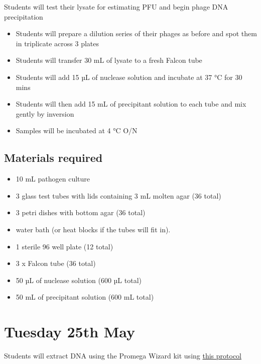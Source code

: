 \documentclass[
]{book}
\providecommand{\tightlist}{%
  \setlength{\itemsep}{0pt}\setlength{\parskip}{0pt}}
\begin{document}
Students will test their lysate for estimating PFU and begin phage DNA precipitation

\begin{itemize}
\tightlist
\item
  Students will prepare a dilution series of their phages as before and spot them in triplicate across 3 plates
\item
  Students will transfer 30 mL of lysate to a fresh Falcon tube
\item
  Students will add 15 µL of nuclease solution and incubate at 37 °C for 30 mins
\item
  Students will then add 15 mL of precipitant solution to each tube and mix gently by inversion
\item
  Samples will be incubated at 4 °C O/N
\end{itemize}

\hypertarget{materials-required}{%
\subsection{Materials required}\label{materials-required}}

\begin{itemize}
\tightlist
\item
  10 mL pathogen culture
\item
  3 glass test tubes with lids containing 3 mL molten agar (36 total)
\item
  3 petri dishes with bottom agar (36 total)
\item
  water bath (or heat blocks if the tubes will fit in).
\item
  1 sterile 96 well plate (12 total)
\item
  3 x Falcon tube (36 total)
\item
  50 µL of nuclease solution (600 µL total)
\item
  50 mL of precipitant solution (600 mL total)
\end{itemize}

\hypertarget{tuesday-25th-may}{%
\section{Tuesday 25th May}\label{tuesday-25th-may}}

Students will extract DNA using the Promega Wizard kit using \href{https://cpt.tamu.edu/wordpress/wp-content/uploads/2011/12/Phage-DNA-extraction-modified-Wizard-method-07-12-2011.pdf}{this protocol}
\end{document}
